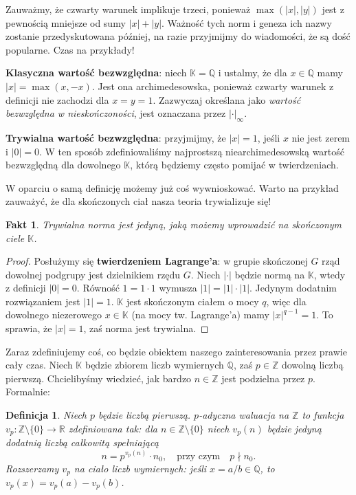 \documentclass[a4paper,fleqn]{article}
\newtheorem{fkt}{Fakt}
\newtheorem{dff}{Definicja}
\begin{document}
\begin{multicols}{2}
Zauważmy, że czwarty warunek implikuje trzeci, ponieważ $\max(|x|,|y|)$ jest z pewnością mniejsze od sumy $|x| + |y|$. Ważność tych norm i geneza ich nazwy zostanie przedyskutowana później, na razie przyjmijmy do wiadomości, że są dość popularne. Czas na przykłady!

\textbf{Klasyczna wartość bezwzględna}: niech $\mathbb K = \mathbb Q$ i ustalmy, że dla $x\in\mathbb Q$ mamy $|x| = \max(x,-x)$. Jest ona archimedesowska, ponieważ czwarty warunek z definicji nie zachodzi dla $x = y = 1$. Zazwyczaj określana jako \emph{wartość bezwzględna w nieskończoności}, jest oznaczana przez $|\cdot|_\infty$.

\textbf{Trywialna wartość bezwzględna}: przyjmijmy, że $|x| = 1$, jeśli $x$ nie jest zerem i $|0| = 0$. W ten sposób zdefiniowaliśmy najprostszą niearchimedesowską wartość bezwzględną dla dowolnego $\mathbb K$, którą będziemy często pomijać w twierdzeniach.

W oparciu o samą definicję możemy już coś wywnioskować. Warto na przykład zauważyć, że dla skończonych ciał nasza teoria trywializuje się! 

\begin{fkt}Trywialna norma jest jedyną, jaką możemy wprowadzić na skończonym ciele $\mathbb K$. \end{fkt}
\begin{proof}Posłużymy się \textbf{twierdzeniem Lagrange'a}: w grupie skończonej $G$ rząd dowolnej podgrupy jest dzielnikiem rzędu $G$. Niech $|\cdot|$ będzie normą na $\mathbb K$, wtedy z definicji $|0| = 0$. Równość $1 = 1 \cdot 1$ wymusza $|1| = |1| \cdot |1|$. Jedynym dodatnim rozwiązaniem jest $|1| = 1$. $\mathbb K$ jest skończonym ciałem o mocy $q$, więc dla dowolnego niezerowego $x\in\mathbb K$ (na mocy tw. Lagrange'a) mamy $|x|^{q-1} = 1$. To sprawia, że $|x| = 1$, zaś norma jest trywialna. \end{proof}
 
 Zaraz zdefiniujemy coś, co będzie obiektem naszego zainteresowania przez prawie cały czas. Niech $\mathbb K$ będzie zbiorem liczb wymiernych $\mathbb Q$, zaś $p\in\mathbb Z$ dowolną liczbą pierwszą. Chcielibyśmy wiedzieć, jak bardzo $n\in\mathbb Z$ jest podzielna przez $p$. Formalnie:

\begin{dff}Niech $p$ będzie liczbą pierwszą. $p$-adyczna waluacja na $\mathbb Z$ to funkcja $v_p:\mathbb Z\setminus\{0\} \rightarrow \mathbb R$ zdefiniowana tak: dla $n\in\mathbb Z\setminus\{0\}$ niech $v_p(n)$ będzie jedyną dodatnią liczbą całkowitą spełniającą \[n = p^{v_p(n)} \cdot n_0, \quad \text {przy czym} \quad p\nmid n_0.\] Rozszerzamy $v_p$ na ciało liczb wymiernych: jeśli $x = a/b \in\mathbb Q$, to $v_p(x) = v_p(a) - v_p(b)$.\end{dff}


\end{multicols}
\end{document}
